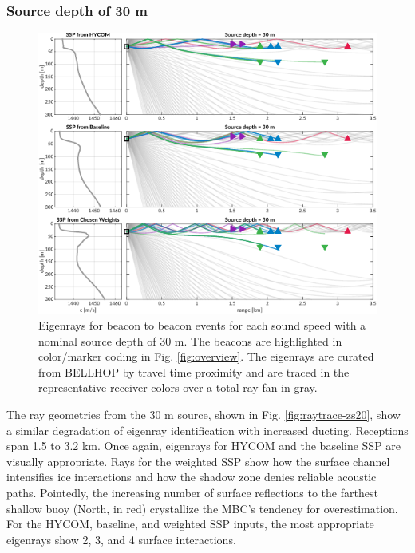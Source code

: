 \subsubsection{Source depth of 30 m}
\begin{figure}[ht!]
  \centering
  \includegraphics[width=\reprintcolumnwidth]{figs/raytrace-3env-zs-30.pdf}
  \caption{Eigenrays for beacon to beacon events for each sound speed with a nominal source depth of 30 m. The beacons are highlighted in color/marker coding in Fig. \ref{fig:overview}. The eigenrays are curated from BELLHOP by travel time proximity and are traced in the representative receiver colors over a total ray fan in gray.}
  \label{fig:raytrace-zs30}
\end{figure}

The ray geometries from the 30 m source, shown in Fig. \ref{fig:raytrace-zs20}, show a similar degradation of eigenray identification with increased ducting.
Receptions span 1.5 to 3.2 km.
Once again, eigenrays for HYCOM and the baseline SSP are visually appropriate.
Rays for the weighted SSP show how the surface channel intensifies ice interactions and how the shadow zone denies reliable acoustic paths.
Pointedly, the increasing number of surface reflections to the farthest shallow buoy (North, in red) crystallize the MBC's tendency for overestimation.
For the HYCOM, baseline, and weighted SSP inputs, the most appropriate eigenrays show 2, 3, and 4 surface interactions.

